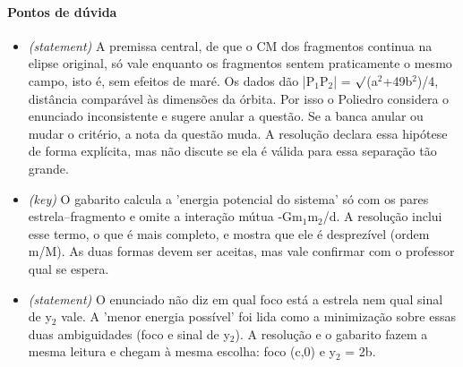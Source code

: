 \documentclass{article}%
\begin{document}
\paragraph{Pontos de dúvida}%
\begin{itemize}%
\item%
\textit{(statement)} A premissa central, de que o CM dos fragmentos continua na elipse original, só vale enquanto os fragmentos sentem praticamente o mesmo campo, isto é, sem efeitos de maré. Os dados dão |P$_{1}$P$_{2}$| = $\surd$(a$^2$+49b$^2$)/4, distância comparável às dimensões da órbita. Por isso o Poliedro considera o enunciado inconsistente e sugere anular a questão. Se a banca anular ou mudar o critério, a nota da questão muda. A resolução declara essa hipótese de forma explícita, mas não discute se ela é válida para essa separação tão grande.%
\item%
\textit{(key)} O gabarito calcula a 'energia potencial do sistema' só com os pares estrela--fragmento e omite a interação mútua -Gm$_{1}$m$_{2}$/d. A resolução inclui esse termo, o que é mais completo, e mostra que ele é desprezível (ordem m/M). As duas formas devem ser aceitas, mas vale confirmar com o professor qual se espera.%
\item%
\textit{(statement)} O enunciado não diz em qual foco está a estrela nem qual sinal de y$_{2}$ vale. A 'menor energia possível' foi lida como a minimização sobre essas duas ambiguidades (foco e sinal de y$_{2}$). A resolução e o gabarito fazem a mesma leitura e chegam à mesma escolha: foco (c,0) e y$_{2}$ = 2b.%
\end{itemize}%
\end{document}
